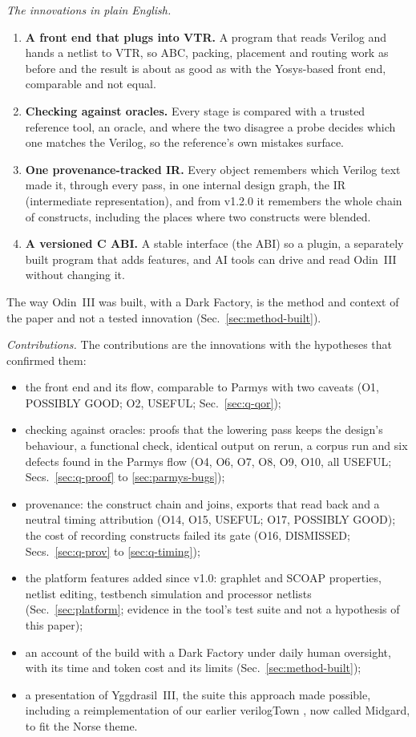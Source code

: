 \documentclass[conference]{IEEEtran}
\begin{document}
\emph{The innovations in plain English.}
\begin{enumerate}
\item \textbf{A front end that plugs into VTR.} A program that reads Verilog and hands a netlist to VTR, so ABC, packing, placement and routing work as before and the result is about as good as with the Yosys-based front end, comparable and not equal.
\item \textbf{Checking against oracles.} Every stage is compared with a trusted reference tool, an oracle, %
and where the two disagree a probe decides which one matches the Verilog, so the reference's own mistakes surface.
\item \textbf{One provenance-tracked IR.} Every object remembers which Verilog text made it, through every pass, in one internal design graph, the IR (intermediate representation), %
and from v1.2.0 it remembers the whole chain of constructs, including the places where two constructs were blended.
\item \textbf{A versioned C ABI.} A stable interface (the ABI) so a plugin, a separately built program that adds features, and AI tools can drive and read Odin~III without changing it. %
\end{enumerate}
The way Odin~III was built, with a Dark Factory, is the method and context of the paper and not a tested innovation (Sec.~\ref{sec:method-built}).

\emph{Contributions.} The contributions are the innovations with the hypotheses that confirmed them:
\begin{itemize}
\item the front end and its flow, comparable to Parmys with two caveats (O1, POSSIBLY GOOD; O2, USEFUL; Sec.~\ref{sec:q-qor});
\item checking against oracles: proofs that the lowering pass keeps the design's behaviour, a functional check, identical output on rerun, a corpus run and six defects found in the Parmys flow (O4, O6, O7, O8, O9, O10, all USEFUL; Secs.~\ref{sec:q-proof} to \ref{sec:parmys-bugs});
\item provenance: the construct chain and joins, exports that read back and a neutral timing attribution (O14, O15, USEFUL; O17, POSSIBLY GOOD); the cost of recording constructs failed its gate (O16, DISMISSED; Secs.~\ref{sec:q-prov} to \ref{sec:q-timing});
\item the platform features added since v1.0: graphlet and SCOAP properties, netlist editing, testbench simulation and processor netlists (Sec.~\ref{sec:platform}; evidence in the tool's test suite and not a hypothesis of this paper);
\item an account of the build with a Dark Factory under daily human oversight, with its time and token cost and its limits (Sec.~\ref{sec:method-built});
\item a presentation of Yggdrasil~III, the suite this approach made possible, including a reimplementation of our earlier verilogTown \cite{verilogTown}, now called Midgard, to fit the Norse theme.
\end{itemize}
\end{document}
